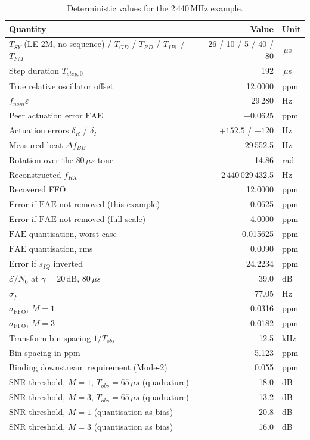 \documentclass[11pt,a4paper]{article}
\newcommand{\us}{\,\ensuremath{\upmu}s}
\newcommand{\FFO}{\mathrm{FFO}}
\newcommand{\FAE}{\mathrm{FAE}}
\newcommand{\Tsy}{T_{SY}}
\newcommand{\Tgd}{T_{GD}}
\newcommand{\Tfm}{T_{FM}}
\newcommand{\Trd}{T_{RD}}
\newcommand{\Tipone}{T_{IP1}}
\providecommand{\upmu}{\mu}
\begin{document}
\begin{table}[h]
\caption{Deterministic values for the 2\,440\,MHz example.}
\label{tab:exvalues}
\centering\small
\begin{tabular}{@{}L{62mm}rl@{}}
\toprule
Quantity & Value & Unit \\
\midrule
$\Tsy$ (LE 2M, no sequence) / $\Tgd$ / $\Trd$ / $\Tipone$ / $\Tfm$ & 26 / 10 / 5 / 40 / 80 & \us \\
Step duration $T_{step,0}$ & 192 & \us \\
True relative oscillator offset & 12.0000 & ppm \\
$f_{nom}\varepsilon$ & 29\,280 & Hz \\
Peer actuation error $\FAE$ & $+0.0625$ & ppm \\
Actuation errors $\delta_R$ / $\delta_I$ & $+152.5$ / $-120$ & Hz \\
Measured beat $\Delta f_{BB}$ & 29\,552.5 & Hz \\
Rotation over the $80\us$ tone & 14.86 & rad \\
Reconstructed $f_{RX}$ & 2\,440\,029\,432.5 & Hz \\
Recovered FFO & 12.0000 & ppm \\
Error if $\FAE$ not removed (this example) & 0.0625 & ppm \\
Error if $\FAE$ not removed (full scale) & 4.0000 & ppm \\
$\FAE$ quantisation, worst case & 0.015625 & ppm \\
$\FAE$ quantisation, rms & 0.0090 & ppm \\
Error if $s_{IQ}$ inverted & 24.2234 & ppm \\
$\mathcal{E}/N_0$ at $\gamma=20$\,dB, $80\us$ & 39.0 & dB \\
$\sigma_f$ & 77.05 & Hz \\
$\sigma_\FFO$, $M=1$ & 0.0316 & ppm \\
$\sigma_\FFO$, $M=3$ & 0.0182 & ppm \\
Transform bin spacing $1/T_{obs}$ & 12.5 & kHz \\
Bin spacing in ppm & 5.123 & ppm \\
Binding downstream requirement (Mode-2) & 0.055 & ppm \\
SNR threshold, $M=1$, $T_{obs}=65\us$ (quadrature) & 18.0 & dB \\
SNR threshold, $M=3$, $T_{obs}=65\us$ (quadrature) & 13.2 & dB \\
SNR threshold, $M=1$ (quantisation as bias) & 20.8 & dB \\
SNR threshold, $M=3$ (quantisation as bias) & 16.0 & dB \\
\bottomrule
\end{tabular}
\end{table}
\end{document}
